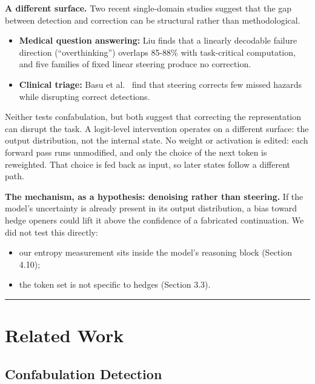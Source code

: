\documentclass[11pt,letterpaper]{article}
\providecommand{\tightlist}{\setlength{\itemsep}{0pt}\setlength{\parskip}{0pt}}
\DeclareRobustCommand{\_}{\textunderscore\allowbreak}
\begin{document}
\textbf{A different surface.} Two recent single-domain studies suggest that the gap between detection and correction can be structural rather than methodological.

\begin{itemize}
\tightlist
\item
  \textbf{Medical question answering:} Liu \cite{liu2026decodable} finds that a linearly decodable failure direction (``overthinking'') overlaps 85-88\% with task-critical computation, and five families of fixed linear steering produce no correction.
\item
  \textbf{Clinical triage:} Basu et al.~\cite{basu2026interpretability} find that steering corrects few missed hazards while disrupting correct detections.
\end{itemize}

Neither tests confabulation, but both suggest that correcting the representation can disrupt the task. A logit-level intervention operates on a different surface: the output distribution, not the internal state. No weight or activation is edited: each forward pass runs unmodified, and only the choice of the next token is reweighted. That choice is fed back as input, so later states follow a different path.

\textbf{The mechanism, as a hypothesis: denoising rather than steering.} If the model's uncertainty is already present in its output distribution, a bias toward hedge openers could lift it above the confidence of a fabricated continuation. We did not test this directly:

\begin{itemize}
\tightlist
\item
  our entropy measurement sits inside the model's reasoning block (Section 4.10);
\item
  the token set is not specific to hedges (Section 3.3).
\end{itemize}

\begin{center}\rule{0.5\linewidth}{0.5pt}\end{center}

\hypertarget{related-work}{%
\section{Related Work}\label{related-work}}

\hypertarget{confabulation-detection}{%
\subsection{Confabulation Detection}\label{confabulation-detection}}
\end{document}
